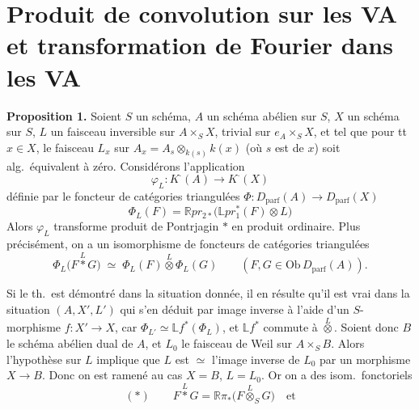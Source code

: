 \documentclass[11pt,a4paper]{article}
\begin{document}
\section*{Produit de convolution sur les VA et transformation de Fourier dans les VA}



\textbf{Proposition 1.} Soient $S$ un schéma, $A$ un schéma abélien sur $S$,
$X$ un schéma sur $S$, $L$ un \struck{\ill{}} faisceau inversible sur
\struck{\ill{}} $A \times_S X$,  trivial
sur $e_A \times_S X$, et tel que  pour tt $x \in X$,
le faisceau $L_x$ sur $A_x = A_s \otimes_{k(s)} k(x)$ (où $s$ est
 de $x$) soit alg.\ équivalent à zéro. Considérons
l'application
\[
  \varphi_L \colon K^{\cdot}(A) \longrightarrow K^{\cdot}(X)
\]
définie par  le foncteur de catégories
triangulées $\Phi \colon D_{\mathrm{parf}}(A) \to D_{\mathrm{parf}}(X)$
\[
  \Phi_L(F) = \mathbb{R}pr_{2*}\bigl(\mathbb{L}pr_1^{*}(F) \otimes L\bigr)
\]
Alors $\varphi_L$ transforme produit de Pontrjagin $*$ en produit ordinaire.
Plus précisément, on a un isomorphisme de foncteurs de catégories triangulées
\[
  \Phi_L\bigl(F \overset{L}{*} G\bigr) \;\simeq\;
  \Phi_L(F) \overset{L}{\otimes} \Phi_L(G)
  \qquad (F, G \in \mathrm{Ob}\, D_{\mathrm{parf}}(A)).
\]



Si le th.\ est démontré dans la situation donnée, il en résulte qu'il est vrai
 dans la situation $(A, X', L')$ qui s'en déduit par image
inverse à l'aide d'un $S$-morphisme $f \colon X' \to X$, car
$\Phi_{L'} \simeq \mathbb{L}f^{*}(\Phi_L)$, et $\mathbb{L}f^{*}$ commute à
$\overset{L}{\otimes}$. Soient donc $B$ le schéma abélien dual de $A$, et
$L_0$ le faisceau de Weil sur $A \times_S B$. Alors l'hypothèse sur $L$
implique que $L$ est $\simeq$ l'image inverse de $L_0$ par un morphisme
$X \to B$. Donc on est ramené au cas $X = B$, $L = L_0$.  Or on a
des isom.\ fonctoriels
\[
  (*) \qquad F \overset{L}{*} G = \mathbb{R}\pi_{*}\bigl(F \overset{L}{\otimes}_S G\bigr)
  \quad \text{et}
\]
\end{document}
